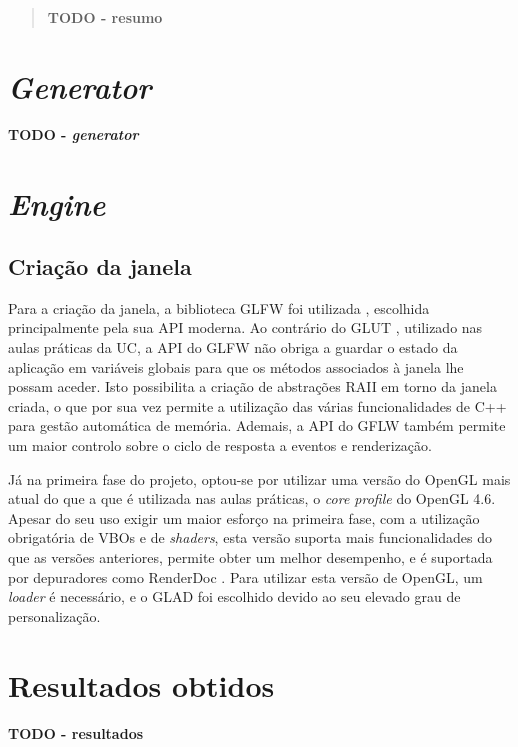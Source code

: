 \documentclass[12pt, a4paper]{article}
\begin{document}
\pagebreak

\begin{abstract}
    \textbf{\color{red} TODO - resumo}
\end{abstract}

\section{\emph{Generator}}

\textbf{\color{red} TODO - \emph{generator}}

\section{\emph{Engine}}

\subsection{Criação da janela}

Para a criação da janela, a biblioteca GLFW foi utilizada \cite{glfw}, escolhida principalmente pela
sua API moderna. Ao contrário do GLUT \cite{glut}, utilizado nas aulas práticas da UC, a API do GLFW
não obriga a guardar o estado da aplicação em variáveis globais para que os métodos associados à
janela lhe possam aceder. Isto possibilita a criação de abstrações RAII em torno da janela criada, o
que por sua vez permite a utilização das várias funcionalidades de C++ para gestão automática de
memória. Ademais, a API do GFLW também permite um maior controlo sobre o ciclo de resposta a eventos
e renderização.

Já na primeira fase do projeto, optou-se por utilizar uma versão do OpenGL mais atual do que a que é
utilizada nas aulas práticas, o \emph{core profile} do OpenGL 4.6. Apesar do seu uso exigir um maior
esforço na primeira fase, com a utilização obrigatória de VBOs e de \emph{shaders}, esta versão
suporta mais funcionalidades do que as versões anteriores, permite obter um melhor desempenho, e é
suportada por depuradores como RenderDoc \cite{renderdoc}. Para utilizar esta versão de OpenGL, um
\emph{loader} é necessário, e o GLAD \cite{glad} foi escolhido devido ao seu elevado grau de
personalização.

\section{Resultados obtidos}

\textbf{\color{red} TODO - resultados}
\end{document}
